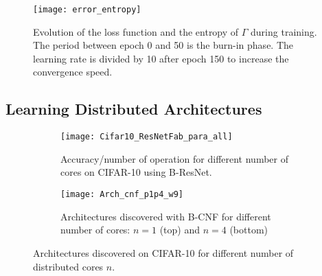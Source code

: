 \documentclass[10pt,twocolumn,letterpaper]{article}
\begin{document}
\begin{figure}[ht]
\begin{center}
\texttt{[image: error\_entropy]}
\end{center}

\caption{Evolution of the loss function and the entropy of $\Gamma$ during training. The period between epoch 0 and 50 is the burn-in phase. The learning rate is divided by 10 after epoch 150 to increase the convergence speed.}
\label{fig:dynamics}
\end{figure}





\subsection{Learning Distributed Architectures}\label{parallel_section}

\begin{figure*}[h]
\centering
    \begin{subfigure}[t]{0.65\textwidth}
        \texttt{[image: Cifar10\_ResNetFab\_para\_all]}
        \caption{Accuracy/number of operation for different number of cores on CIFAR-10 using B-ResNet.}
     \end{subfigure} 
     \hspace{.7em}
     \begin{subfigure}[t]{0.30\textwidth}
     	\vspace{-15em}
        \texttt{[image: Arch\_cnf\_p1p4\_w9]}
        \caption{Architectures discovered with B-CNF for different number of cores: $n=1$ (top) and $n=4$ (bottom)}
        \label{fig:para_arch}
     \end{subfigure}
\caption{Architectures discovered on CIFAR-10 for different number of distributed cores $n$.}
\label{fig:para_res_arch}
\end{figure*}


%
%
\end{document}
